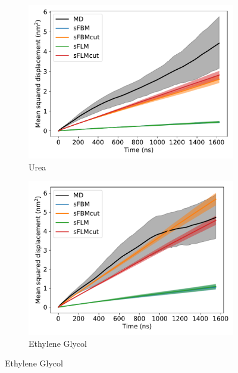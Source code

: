 \documentclass{article}
\begin{document}
  \begin{figure}
  \centering
  \begin{subfigure}{0.45\textwidth}
  \includegraphics[width=\textwidth]{2mode_msd_comparison_URE.pdf}
  \caption{Urea}\label{fig:2mode_msd_comparison_URE}
  \end{subfigure}
  \begin{subfigure}{0.45\textwidth}
  \includegraphics[width=\textwidth]{2mode_msd_comparison_GCL.pdf}
  \caption{Ethylene Glycol}\label{fig:2mode_msd_comparison_GCL}
  \end{subfigure}

\end{figure}
\end{document}
